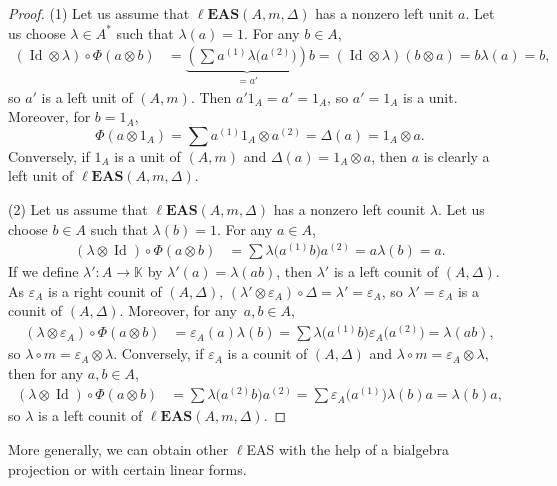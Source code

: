 \documentclass[pdftex]{sigma}
\numberwithin{equation}{section}
\newcommand{\leas}{\ell\mathbf{EAS}}
\begin{document}
\begin{proof}
(1) Let us assume that $\leas(A,m,\Delta)$ has a nonzero left unit $a$. Let us choose $\lambda \in A^*$ such that $\lambda(a)=1$. For any $b\in A$,
\begin{align*}
(\operatorname{Id} \otimes \lambda)\circ \Phi(a\otimes b)&=\underbrace{\left(\sum a^{(1)}\lambda\bigl(a^{(2)}\bigr)\right)}_{=a'} b=(\operatorname{Id} \otimes \lambda)(b\otimes a)=b\lambda(a)=b,
\end{align*}
so $a'$ is a left unit of $(A,m)$. Then $a'1_A=a'=1_A$, so $a'=1_A$ is a unit. Moreover, for $b=1_A$,
\[\Phi(a\otimes 1_A)=\sum a^{(1)}1_A\otimes a^{(2)}=\Delta(a)=1_A\otimes a.\]
Conversely, if $1_A$ is a unit of $(A,m)$ and $\Delta(a)=1_A\otimes a$, then $a$ is clearly a left unit of $\leas(A,m,\Delta)$.

(2) Let us assume that $\leas(A,m,\Delta)$ has a nonzero left counit $\lambda$. Let us choose $b\in A$ such that $\lambda(b)=1$. For any $a\in A$,
\begin{align*}
(\lambda \otimes \operatorname{Id})\circ \Phi(a\otimes b)&=\sum \lambda\bigl(a^{(1)}b\bigr)a^{(2)}=a\lambda(b)=a.
\end{align*}
If we define $\lambda'\colon A\longrightarrow \mathbb{K}$ by $\lambda'(a)=\lambda(ab)$, then $\lambda'$ is a left counit of $(A,\Delta)$. As $\varepsilon_A$ is a right counit of $(A,\Delta)$,
$(\lambda'\otimes \varepsilon_A)\circ \Delta=\lambda'=\varepsilon_A$,
so $\lambda'=\varepsilon_A$ is a counit of $(A,\Delta)$. Moreover, for any~${a,b\in A}$,
\begin{align*}
(\lambda \otimes \varepsilon_A)\circ \Phi(a\otimes b)&=\varepsilon_A(a)\lambda(b)=\sum \lambda\bigl(a^{(1)}b\bigr)\varepsilon_A\bigl(a^{(2)}\bigr)=\lambda(ab),
\end{align*}
so $\lambda \circ m=\varepsilon_A\otimes \lambda$. Conversely, if $\varepsilon_A$ is a counit of $(A,\Delta)$ and $\lambda \circ m=\varepsilon_A\otimes \lambda$, then for any $a,b\in A$,
\begin{align*}
(\lambda \otimes \operatorname{Id})\circ \Phi(a\otimes b)&=\sum \lambda\bigl(a^{(2)}b\bigr)a^{(2)}=\sum \varepsilon_A\bigl(a^{(1)}\bigr)\lambda(b)a=\lambda(b)a,
\end{align*}
so $\lambda$ is a left counit of $\leas(A,m,\Delta)$. \end{proof}

More generally, we can obtain other $\ell$EAS with the help of a bialgebra projection or with certain linear forms.
\end{document}
